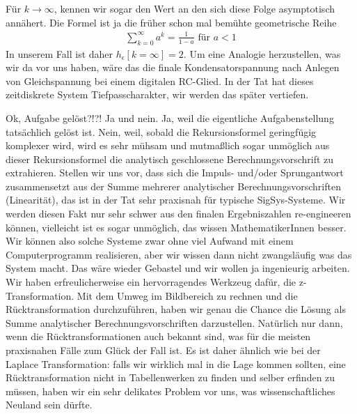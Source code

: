 \begin{Ansatz}
Für $k \to \infty$, kennen wir sogar den Wert an den sich diese Folge
asymptotisch annähert. Die Formel ist ja die früher schon mal bemühte
geometrische Reihe
\begin{align}
\sum_{k=0}^\infty a^k = \frac{1}{1-a}\text{ für } a<1
\end{align}
In unserem Fall ist daher $h_\epsilon[k=\infty] = 2$. Um eine Analogie
herzustellen, was wir da vor uns haben, wäre das die finale Kondensatorspannung
nach Anlegen von Gleichspannung bei einem digitalen RC-Glied. In der Tat hat
dieses zeitdiskrete System Tiefpasscharakter, wir werden das später vertiefen.

Ok, Aufgabe gelöst?!?! Ja und nein. Ja, weil die eigentliche Aufgabenstellung
tatsächlich gelöst ist. Nein, weil, sobald die Rekursionsformel geringfügig
komplexer wird, wird es sehr mühsam und mutmaßlich sogar unmöglich aus dieser
Rekursionsformel die analytisch geschlossene Berechnungsvorschrift zu extrahieren.
Stellen wir uns vor, dass sich die Impuls- und/oder Sprungantwort zusammensetzt
aus der Summe mehrerer analytischer Berechnungsvorschriften (Linearität),
das ist in der Tat sehr praxisnah für typische SigSys-Systeme. Wir werden diesen
Fakt nur sehr schwer aus den finalen Ergebniszahlen re-engineeren können, vielleicht
ist es sogar unmöglich, das wissen MathematikerInnen besser.
Wir können also solche Systeme zwar ohne viel Aufwand mit einem Computerprogramm
realisieren, aber wir wissen dann nicht zwangsläufig was das System macht.
Das wäre wieder Gebastel und wir wollen ja ingenieurig arbeiten.
%
Wir haben erfreulicherweise ein hervorragendes Werkzeug dafür, die z-Transformation.
Mit dem Umweg im Bildbereich zu rechnen und die Rücktransformation durchzuführen,
haben wir genau die Chance die Lösung als Summe analytischer Berechnungsvorschriften
darzustellen. Natürlich nur dann, wenn die Rücktransformationen auch bekannt sind,
was für die meisten praxisnahen Fälle zum Glück der Fall ist. Es ist daher ähnlich
wie bei der Laplace Transformation: falls wir wirklich mal in die Lage kommen
sollten, eine Rücktransformation nicht in Tabellenwerken zu finden und selber
erfinden zu müssen, haben wir ein sehr delikates Problem vor uns, was
wissenschaftliches Neuland sein dürfte.
\end{Ansatz}

